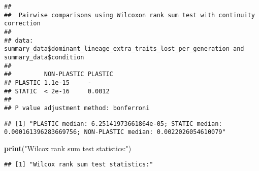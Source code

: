 \documentclass[]{book}
\newenvironment{Shaded}{\begin{snugshade}}{\end{snugshade}}
\newcommand{\DataTypeTok}[1]{\textcolor[rgb]{0.13,0.29,0.53}{#1}}
\newcommand{\KeywordTok}[1]{\textcolor[rgb]{0.13,0.29,0.53}{\textbf{#1}}}
\newcommand{\NormalTok}[1]{#1}
\newcommand{\OperatorTok}[1]{\textcolor[rgb]{0.81,0.36,0.00}{\textbf{#1}}}
\newcommand{\StringTok}[1]{\textcolor[rgb]{0.31,0.60,0.02}{#1}}
\begin{document}
\begin{verbatim}
## 
##  Pairwise comparisons using Wilcoxon rank sum test with continuity correction 
## 
## data:  summary_data$dominant_lineage_extra_traits_lost_per_generation and summary_data$condition 
## 
##         NON-PLASTIC PLASTIC
## PLASTIC 1.1e-15     -      
## STATIC  < 2e-16     0.0012 
## 
## P value adjustment method: bonferroni
\end{verbatim}

\begin{Shaded}
\end{Shaded}

\begin{verbatim}
## [1] "PLASTIC median: 6.25141973661864e-05; STATIC median: 0.000161396283669756; NON-PLASTIC median: 0.0022026054610079"
\end{verbatim}

\begin{Shaded}
\begin{Highlighting}[]
\KeywordTok{print}\NormalTok{(}\StringTok{"Wilcox rank sum test statistics:"}\NormalTok{)}
\end{Highlighting}
\end{Shaded}

\begin{verbatim}
## [1] "Wilcox rank sum test statistics:"
\end{verbatim}
\end{document}
